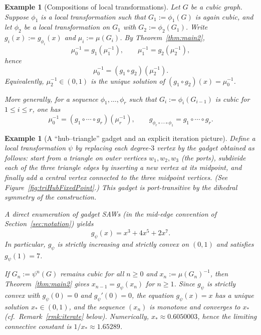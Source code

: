 \documentclass[12pt]{amsart}
\theoremstyle{plain}
\newtheorem{example}[theorem]{Example}
\numberwithin{equation}{section}
\numberwithin{theorem}{section}
\numberwithin{figure}{section}
\begin{document}
\begin{example}[Compositions of local transformations]\label{ex:compositions}
Let $G$ be a cubic graph. Suppose $\phi_1$ is a local transformation such that
$G_1:=\phi_1(G)$ is again cubic, and let $\phi_2$ be a local transformation on $G_1$ with
$G_2:=\phi_2(G_1)$.
Write $g_i(x):=g_{\phi_i}(x)$ and $\mu_i:=\mu(G_i)$.
By Theorem~\ref{thm:main2},
\[
\mu_0^{-1}=g_1(\mu_1^{-1}),\qquad \mu_1^{-1}=g_2(\mu_2^{-1}),
\]
hence
\[
\mu_0^{-1}=(g_1\circ g_2)(\mu_2^{-1}).
\]
Equivalently, $\mu_2^{-1}\in(0,1)$ is the unique solution of $(g_1\circ g_2)(x)=\mu_0^{-1}$.

More generally, for a sequence $\phi_1,\dots,\phi_r$ such that $G_i:=\phi_i(G_{i-1})$ is cubic for
$1\le i\le r$, one has
\[
\mu_0^{-1}=(g_1\circ\cdots\circ g_r)(\mu_r^{-1}),
\qquad
g_{\phi_r\circ\cdots\circ \phi_1}=g_1\circ\cdots\circ g_r.
\]
\end{example}

\begin{example}[A ``hub--triangle'' gadget and an explicit iteration picture]\label{ex:hub-triangle}
Define a local transformation $\psi$ by replacing each degree-$3$ vertex by the gadget obtained as follows:
start from a triangle on outer vertices $w_1,w_2,w_3$ (the ports), subdivide each of the three triangle edges by
inserting a new vertex at its midpoint, and finally add a central vertex connected to the three midpoint vertices.
(See Figure~\ref{fig:triHubFixedPoint}.)  This gadget is port-transitive by the dihedral symmetry of the construction.

A direct enumeration of gadget SAWs (in the mid-edge convention of Section~\ref{sec:notation}) yields
\begin{equation}\label{eq:ghub}
g_\psi(x)=x^3+4x^5+2x^7.
\end{equation}
In particular, $g_\psi$ is strictly increasing and strictly convex on $(0,1)$ and satisfies $g_\psi(1)=7$.

If $G_n:=\psi^n(G)$ remains cubic for all $n\ge0$ and $x_n:=\mu(G_n)^{-1}$, then Theorem~\ref{thm:main2} gives
$x_{n-1}=g_\psi(x_n)$ for $n\ge1$.
Since $g_\psi$ is strictly convex with $g_\psi(0)=0$ and $g_\psi'(0)=0$, the equation $g_\psi(x)=x$ has a unique solution
$x_\ast\in(0,1)$, and the sequence $(x_n)$ is monotone and converges to $x_\ast$ (cf.\ Remark~\ref{rmk:iterate} below).
Numerically, $x_\ast\approx 0.6050003$, hence the limiting connective constant is $1/x_\ast\approx 1.65289$.
\end{example}
\end{document}
